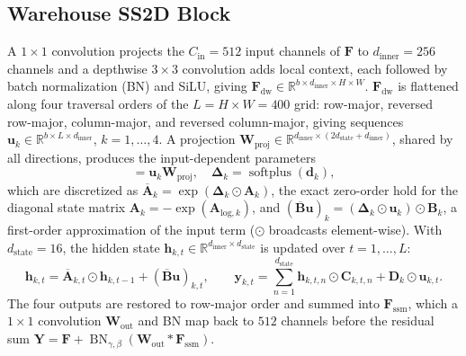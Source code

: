 \subsection{Warehouse SS2D Block}
\label{sec:mamba_integration}
A $1 \times 1$ convolution projects the $C_{\text{in}} = 512$ input channels of $\mathbf{F}$ to $d_{\text{inner}} = 256$ channels and a depthwise $3 \times 3$ convolution adds local context, each followed by batch normalization (BN) and SiLU, giving $\mathbf{F}_{\text{dw}} \in \mathbb{R}^{b \times d_{\text{inner}} \times H \times W}$. $\mathbf{F}_{\text{dw}}$ is flattened along four traversal orders of the $L = H \times W = 400$ grid: row-major, reversed row-major, column-major, and reversed column-major, giving sequences $\mathbf{u}_k \in \mathbb{R}^{b \times L \times d_{\text{inner}}}$, $k = 1, \dots, 4$. A projection $\mathbf{W}_{\text{proj}} \in \mathbb{R}^{d_{\text{inner}} \times (2 d_{\text{state}} + d_{\text{inner}})}$, shared by all directions, produces the input-dependent parameters
\begin{equation}
    [\mathbf{B}_k, \mathbf{C}_k, \mathbf{d}_k] = \mathbf{u}_k \mathbf{W}_{\text{proj}}, \quad \boldsymbol{\Delta}_k = \operatorname{softplus}(\mathbf{d}_k),
\end{equation}
which are discretized as $\overline{\mathbf{A}}_k = \exp(\boldsymbol{\Delta}_k \odot \mathbf{A}_k)$, the exact zero-order hold for the diagonal state matrix $\mathbf{A}_k = -\exp(\mathbf{A}_{\text{log}, k})$, and $(\overline{\mathbf{B}}\mathbf{u})_k = (\boldsymbol{\Delta}_k \odot \mathbf{u}_k) \odot \mathbf{B}_k$, a first-order approximation of the input term ($\odot$ broadcasts element-wise). With $d_{\text{state}} = 16$, the hidden state $\mathbf{h}_{k,t} \in \mathbb{R}^{d_{\text{inner}} \times d_{\text{state}}}$ is updated over $t = 1, \dots, L$:
\begin{equation}
    \mathbf{h}_{k,t} = \overline{\mathbf{A}}_{k,t} \odot \mathbf{h}_{k,t-1} + (\overline{\mathbf{B}}\mathbf{u})_{k,t}, \qquad
    \mathbf{y}_{k,t} = \textstyle\sum_{n=1}^{d_{\text{state}}} \mathbf{h}_{k,t,n} \odot \mathbf{C}_{k,t,n} + \mathbf{D}_k \odot \mathbf{u}_{k,t}.
\end{equation}
The four outputs are restored to row-major order and summed into $\mathbf{F}_{\text{ssm}}$, which a $1 \times 1$ convolution $\mathbf{W}_{\text{out}}$ and BN map back to $512$ channels before the residual sum $\mathbf{Y} = \mathbf{F} + \operatorname{BN}_{\gamma, \beta}(\mathbf{W}_{\text{out}} * \mathbf{F}_{\text{ssm}})$.

